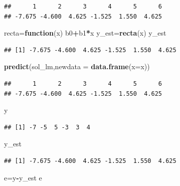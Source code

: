 \documentclass[
]{article}
\newenvironment{Shaded}{\begin{snugshade}}{\end{snugshade}}
\newcommand{\ControlFlowTok}[1]{\textcolor[rgb]{0.13,0.29,0.53}{\textbf{#1}}}
\newcommand{\DataTypeTok}[1]{\textcolor[rgb]{0.13,0.29,0.53}{#1}}
\newcommand{\KeywordTok}[1]{\textcolor[rgb]{0.13,0.29,0.53}{\textbf{#1}}}
\newcommand{\NormalTok}[1]{#1}
\newcommand{\OperatorTok}[1]{\textcolor[rgb]{0.81,0.36,0.00}{\textbf{#1}}}
\begin{document}
\begin{verbatim}
##      1      2      3      4      5      6 
## -7.675 -4.600  4.625 -1.525  1.550  4.625
\end{verbatim}

\begin{Shaded}
\begin{Highlighting}[]
\NormalTok{recta=}\ControlFlowTok{function}\NormalTok{(x) b0}\OperatorTok{+}\NormalTok{b1}\OperatorTok{*}\NormalTok{x}
\NormalTok{y\_est=}\KeywordTok{recta}\NormalTok{(x)}
\NormalTok{y\_est}
\end{Highlighting}
\end{Shaded}

\begin{verbatim}
## [1] -7.675 -4.600  4.625 -1.525  1.550  4.625
\end{verbatim}

\begin{Shaded}
\begin{Highlighting}[]
\KeywordTok{predict}\NormalTok{(sol\_lm,}\DataTypeTok{newdata =} \KeywordTok{data.frame}\NormalTok{(}\DataTypeTok{x=}\NormalTok{x))}
\end{Highlighting}
\end{Shaded}

\begin{verbatim}
##      1      2      3      4      5      6 
## -7.675 -4.600  4.625 -1.525  1.550  4.625
\end{verbatim}

\begin{Shaded}
\begin{Highlighting}[]
\NormalTok{y}
\end{Highlighting}
\end{Shaded}

\begin{verbatim}
## [1] -7 -5  5 -3  3  4
\end{verbatim}

\begin{Shaded}
\begin{Highlighting}[]
\NormalTok{y\_est}
\end{Highlighting}
\end{Shaded}

\begin{verbatim}
## [1] -7.675 -4.600  4.625 -1.525  1.550  4.625
\end{verbatim}

\begin{Shaded}
\begin{Highlighting}[]
\NormalTok{e=y}\OperatorTok{{-}}\NormalTok{y\_est}
\NormalTok{e}
\end{Highlighting}
\end{Shaded}
\end{document}
